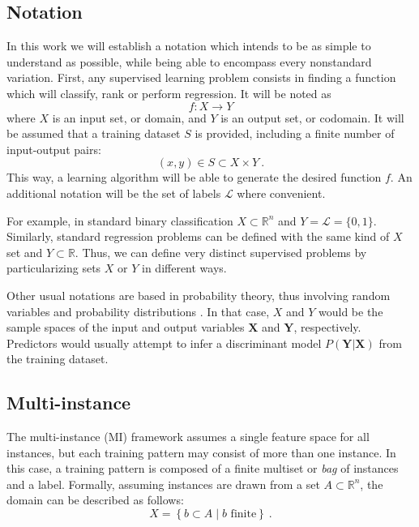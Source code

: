 \documentclass[
	fontsize=11pt, %
	twoside=false, %
	open=any, %
	secnumdepth=1, %
]{kaobook}
\begin{document}
\subsection{Notation}
\label{sec:notation}

In this work we will establish a notation which intends to be as simple to understand as possible, while being able to encompass every nonstandard variation. First, any supervised learning problem consists in finding a function which will classify, rank or perform regression. It will be noted as
\begin{equation}
  f: X\rightarrow Y
\end{equation}
where $X$ is an input set, or domain, and $Y$ is an output set, or codomain. It will be assumed that a training dataset $S$ is provided, including a finite number of input-output pairs:
\begin{equation}
  (x, y)\in S\subset X\times Y~.
\end{equation}
This way, a learning algorithm will be able to generate the desired function $f$. An additional notation will be the set of labels $\mathcal L$ where convenient. 

For example, in standard binary classification $X\subset\mathbb R^n$ and $Y=\mathcal L=\{0, 1\}$. Similarly, standard regression problems can be defined with the same kind of $X$ set and $Y\subset \mathbb R$. Thus, we can define very distinct supervised problems by particularizing sets $X$ or $Y$ in different ways.

Other usual notations are based in probability theory, thus involving random variables and probability distributions \cite{gaussianproc,learning-murphy}. In that case, $X$ and $Y$ would be the sample spaces of the input and output variables $\mathbf X$ and $\mathbf Y$, respectively. Predictors would usually attempt to infer a discriminant model $P(\mathbf Y|\mathbf X)$ from the training dataset.

\subsection{Multi-instance}
\label{sec:minstance}

The multi-instance (MI) framework \cite{mil} assumes a single feature space for all instances, but each training pattern may consist of more than one instance. In this case, a training pattern is composed of a finite multiset or \emph{bag} of instances and a label. Formally, assuming instances are drawn from a set $A\subset\mathbb R^n$, the domain can be described as follows:
\begin{equation}
  X=\left\{b\subset A\mid b \mbox{ finite}\right\}~.
  \end{equation} 
\end{document}
